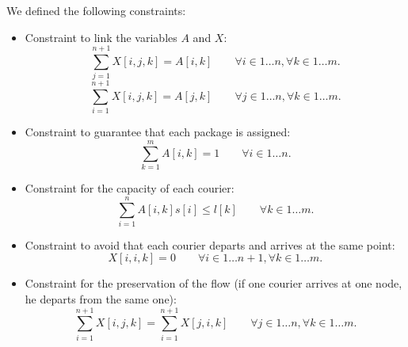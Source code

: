 We defined the following constraints:
\begin{itemize}
    \item Constraint to link the variables $A$ and $X$:
    \begin{equation}
        \sum_{j = 1}^{n+1} X[i,j,k] = A[i,k]  \qquad  \forall i \in 1 \dots n,\forall k \in 1 \dots m.
    \end{equation}
    \begin{equation}
        \sum_{i = 1}^{n+1} X[i,j,k] = A[j,k]  \qquad  \forall j \in 1 \dots n,\forall k \in 1 \dots m.
    \end{equation}

    \item Constraint to guarantee that each package is assigned:
    \begin{equation}
        \sum_{k = 1}^{m} A[i,k] = 1  \qquad \forall i \in 1 \dots n.
    \end{equation}

    \item Constraint for the capacity of each courier:
    \begin{equation}
        \sum_{i = 1}^{n} A[i,k] s[i] \leq l[k] \qquad \forall k \in 1 \dots m.
    \end{equation}

    \item Constraint to avoid that each courier departs and arrives at the same point:
    \begin{equation}
        X[i,i,k] = 0 \qquad \forall i \in 1 \dots n+1, \forall k \in 1 \dots m.
    \end{equation}


    \item Constraint for the preservation of the flow (if one courier arrives at one node, he departs from the same one):
    \begin{equation}
        \sum_{i = 1}^{n+1} X[i,j,k] = \sum_{i = 1}^{n+1} X[j,i,k] \qquad \forall j \in 1 \dots n, \forall k \in 1 \dots m.
    \end{equation}


\end{itemize}
